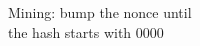 \documentclass[preview]{standalone}
\begin{document}
\begin{center}
Mining: bump the nonce until\\the hash starts with 0000
\end{center}
\end{document}
